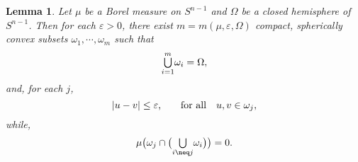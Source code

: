 \documentclass{cpamart1}     %
\newtheorem{lemm}[theo]{Lemma}
\theoremstyle{definition}
\theoremstyle{remark}
\newcommand*{\medcup}{\mathsmaller{\bigcup}}%
\begin{document}
\begin{lemm}\label{e1.5}
Let $\mu$ be a Borel measure on $S^{n-1}$ and $\Omega$
be a closed hemisphere of $S^{n-1}$. Then for each $\varepsilon>0$,
there exist $m=m(\mu, \varepsilon,\Omega)$ compact, spherically convex subsets $\omega_1,\cdots, \omega_m$ such that
\begin{equation*}
\medcup\limits_{i=1}^m\omega_i = \Omega,
\end{equation*}
and, for each $j$,
\begin{equation}\label{e1.6}
\text{$|u-v| \leq \varepsilon$,\qquad for all\quad  $u,v\in \omega_j$},
\end{equation}
while,
\begin{equation}\label{e1.7}
\mu\big(\omega_j\cap\big(\medcup\limits_{i\neq j}\omega_i\big)\big)=0.
\end{equation}
\end{lemm}
\end{document}

